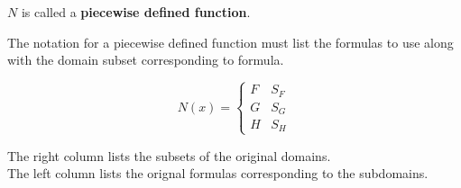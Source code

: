 \documentclass{ximera}
\begin{document}
$N$ is called a \textbf{\textcolor{blue!55!black}{piecewise defined function}}. \\




\begin{notation}


The notation for a piecewise defined function must list the formulas to use along with the domain subset corresponding to formula.



\[
N(x) = 
\begin{cases}
  F & S_F     \\
  G & S_G \\
  H & S_H
\end{cases}
\]



The right column lists the subsets of the original domains.  \\
The left column lists the orignal formulas corresponding to the subdomains.

\end{notation}
\end{document}
